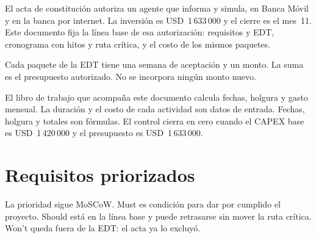 \documentclass[11pt,a4paper]{article}
\newcommand{\usd}[1]{USD~#1}
\begin{document}
El acta de constitución autoriza un agente que informa y simula, en Banca Móvil y en la banca por internet. La inversión es \usd{1\,633\,000} y el cierre es el mes~11. Este documento fija la línea base de esa autorización: requisitos y EDT, cronograma con hitos y ruta crítica, y el costo de los mismos paquetes.

Cada paquete de la EDT tiene una semana de aceptación y un monto. La suma es el presupuesto autorizado. No se incorpora ningún monto nuevo.

El libro de trabajo que acompaña este documento calcula fechas, holgura y gasto mensual. La duración y el costo de cada actividad son datos de entrada. Fechas, holgura y totales son fórmulas. El control cierra en cero cuando el CAPEX base es \usd{1\,420\,000} y el presupuesto es \usd{1\,633\,000}.

\section{Requisitos priorizados}

La prioridad sigue MoSCoW. Must es condición para dar por cumplido el proyecto. Should está en la línea base y puede retrasarse sin mover la ruta crítica. Won't queda fuera de la EDT: el acta ya lo excluyó.
\end{document}
